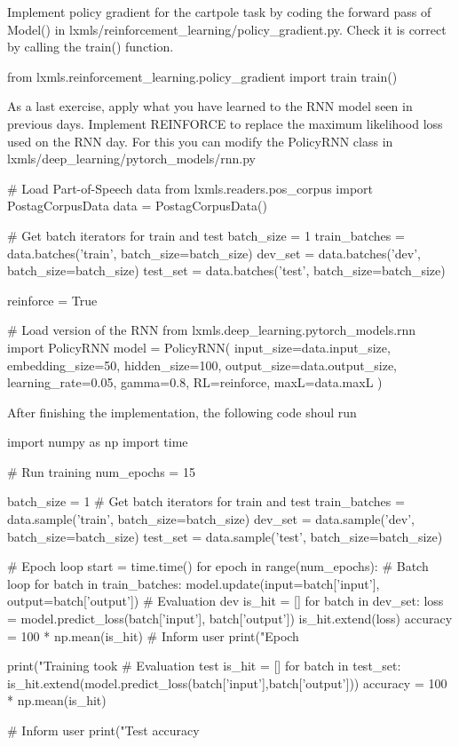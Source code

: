 \begin{exercise}
Implement policy gradient for the cartpole task by coding the forward pass of Model() in lxmls/reinforcement\_learning/policy\_gradient.py. Check it is correct by calling the train() function.
\begin{python}
from lxmls.reinforcement_learning.policy_gradient import train
train()
\end{python}
\end{exercise}


\begin{exercise}
As a last exercise, apply what you have learned to the RNN model seen in previous days. Implement REINFORCE to replace the maximum likelihood loss used on the RNN day. For this you can modify the PolicyRNN class in lxmls/deep\_learning/pytorch\_models/rnn.py 
\begin{python}
# Load Part-of-Speech data 
from lxmls.readers.pos_corpus import PostagCorpusData
data = PostagCorpusData()

# Get batch iterators for train and test
batch_size = 1
train_batches = data.batches('train', batch_size=batch_size)
dev_set = data.batches('dev', batch_size=batch_size)
test_set = data.batches('test', batch_size=batch_size)
\end{python}
\begin{python}
reinforce = True

# Load version of the RNN 
from lxmls.deep_learning.pytorch_models.rnn import PolicyRNN
model = PolicyRNN(
    input_size=data.input_size,
    embedding_size=50,
    hidden_size=100,
    output_size=data.output_size,
    learning_rate=0.05,
    gamma=0.8,
    RL=reinforce,
    maxL=data.maxL
)
\end{python}

After finishing the implementation, the following code shoul run
\begin{python}
import numpy as np
import time

# Run training
num_epochs = 15

batch_size = 1
# Get batch iterators for train and test
train_batches = data.sample('train', batch_size=batch_size)
dev_set = data.sample('dev', batch_size=batch_size)
test_set = data.sample('test', batch_size=batch_size)

# Epoch loop
start = time.time()
for epoch in range(num_epochs):
    # Batch loop
    for batch in train_batches:
        model.update(input=batch['input'], output=batch['output'])
    # Evaluation dev
    is_hit = []
    for batch in dev_set:
        loss = model.predict_loss(batch['input'], batch['output'])
        is_hit.extend(loss)
    accuracy = 100 * np.mean(is_hit)
    # Inform user
    print("Epoch %

print("Training took %
# Evaluation test
is_hit = []
for batch in test_set:
    is_hit.extend(model.predict_loss(batch['input'],batch['output']))
accuracy = 100 * np.mean(is_hit)

# Inform user
print("Test accuracy %
\end{python}
\end{exercise}
